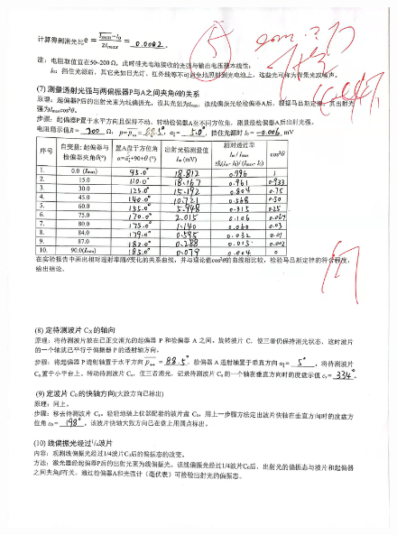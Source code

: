 \documentclass[UTF8]{ctexart}
\begin{document}
\begin{figure}[H]
  \centering
  \includegraphics[scale=0.13]{2.jpg}
\end{figure}
\end{document}
